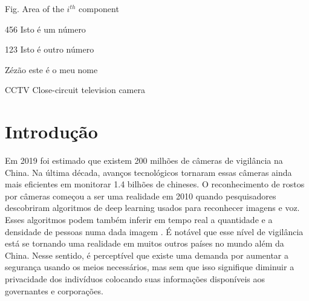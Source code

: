 \documentclass[12pt, %
openright, 
oneside, %
a4paper,    %
brazil]{facom-ufu-abntex2}
\begin{document}
\begin{siglas} %
  \item[Fig.] Area of the $i^{th}$ component
  \item[456] Isto é um número
  \item[123] Isto é outro número
  \item[Zézão] este é o meu nome
  \item[CCTV] Close-circuit television camera 
\end{siglas}


\tableofcontents*
\cleardoublepage





\textual



\chapter[Introdução]{Introdução}
Em 2019 foi estimado que existem 200 milhões de câmeras de vigilância na China. Na última década,
avanços tecnológicos tornaram essas câmeras ainda mais eficientes em monitorar 1.4 bilhões de chineses. 
O reconhecimento de rostos por câmeras começou a ser uma realidade em 2010 quando pesquisadores 
descobriram algoritmos de deep learning usados para reconhecer imagens e voz. Esses algoritmos podem
também inferir em tempo real a quantidade e a densidade de pessoas numa dada imagem
\cite{qiang2019road}. É notável que esse nível de vigilância está se tornando uma realidade em muitos outros
países no mundo além da China. Nesse sentido, é perceptível que existe uma demanda por aumentar a segurança usando os meios 
necessários, mas sem que isso signifique diminuir a privacidade dos indivíduos colocando suas informações disponíveis aos 
governantes e corporações.
\end{document}
